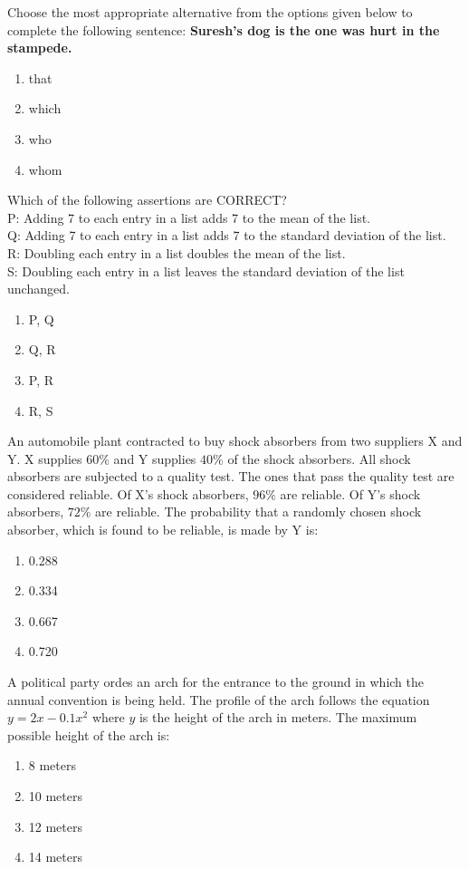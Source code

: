 \item Choose the most appropriate alternative from the options given below to complete the following sentence:  
	\textbf{Suresh's dog is the one \underline{\hspace{1cm}} was hurt in the stampede.}
    \begin{enumerate}
        \item that
        \item which
        \item who
        \item whom
    \end{enumerate}

\item Which of the following assertions are CORRECT?\\
        P: Adding 7 to each entry in a list adds 7 to the mean of the list.\\
        Q: Adding 7 to each entry in a list adds 7 to the standard deviation of the list.\\
        R: Doubling each entry in a list doubles the mean of the list.\\
        S: Doubling each entry in a list leaves the standard deviation of the list unchanged.
    \begin{enumerate}
        \item P, Q
        \item Q, R
        \item P, R
        \item R, S
    \end{enumerate}

\item An automobile plant contracted to buy shock absorbers from two suppliers X and Y. X supplies $60\%$ and Y supplies $40\%$ of the shock absorbers. All shock absorbers are subjected to a quality test. The ones that pass the quality test are considered reliable. Of X's shock absorbers, $96\%$ are reliable. Of Y's shock absorbers, $72\%$ are reliable.  
The probability that a randomly chosen shock absorber, which is found to be reliable, is made by Y is:
    \begin{enumerate}
        \item 0.288
        \item 0.334
        \item 0.667
        \item 0.720
    \end{enumerate}

\item A political party ordes an arch for the entrance to the ground in which the annual convention is being held. The profile of the arch follows the equation $y = 2x - 0.1x^2$ where $y$ is the height of the arch in meters. The maximum possible height of the arch is:
    \begin{enumerate}
        \item 8 meters
        \item 10 meters
        \item 12 meters
        \item 14 meters
    \end{enumerate}

